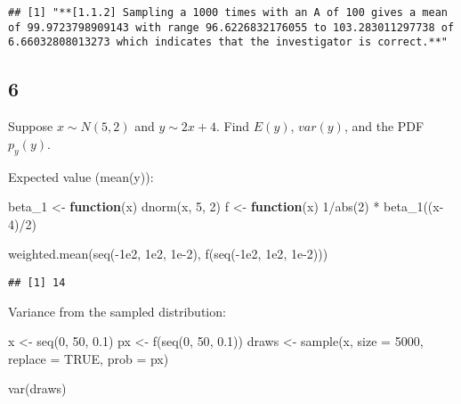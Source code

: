 \documentclass[
]{article}
\newenvironment{Shaded}{\begin{snugshade}}{\end{snugshade}}
\newcommand{\AttributeTok}[1]{\textcolor[rgb]{0.77,0.63,0.00}{#1}}
\newcommand{\ConstantTok}[1]{\textcolor[rgb]{0.00,0.00,0.00}{#1}}
\newcommand{\ControlFlowTok}[1]{\textcolor[rgb]{0.13,0.29,0.53}{\textbf{#1}}}
\newcommand{\DecValTok}[1]{\textcolor[rgb]{0.00,0.00,0.81}{#1}}
\newcommand{\FloatTok}[1]{\textcolor[rgb]{0.00,0.00,0.81}{#1}}
\newcommand{\FunctionTok}[1]{\textcolor[rgb]{0.00,0.00,0.00}{#1}}
\newcommand{\NormalTok}[1]{#1}
\newcommand{\OtherTok}[1]{\textcolor[rgb]{0.56,0.35,0.01}{#1}}
\newcommand{\SpecialCharTok}[1]{\textcolor[rgb]{0.00,0.00,0.00}{#1}}
\begin{document}
\begin{verbatim}
## [1] "**[1.1.2] Sampling a 1000 times with an A of 100 gives a mean of 99.9723798909143 with range 96.6226832176055 to 103.283011297738 of 6.66032808013273 which indicates that the investigator is correct.**"
\end{verbatim}

\hypertarget{section-5}{%
\subsection{6}\label{section-5}}

Suppose \(x\sim N(5,2)\) and \(y\sim 2x+4\). Find \(E(y)\), \(var(y)\),
and the PDF \(p_y(y)\).

Expected value (mean(y)):

\begin{Shaded}
\begin{Highlighting}[]
\NormalTok{beta\_1 }\OtherTok{\textless{}{-}} \ControlFlowTok{function}\NormalTok{(x)}
  \FunctionTok{dnorm}\NormalTok{(x, }\DecValTok{5}\NormalTok{, }\DecValTok{2}\NormalTok{)}
\NormalTok{f }\OtherTok{\textless{}{-}} \ControlFlowTok{function}\NormalTok{(x)}
  \DecValTok{1}\SpecialCharTok{/}\FunctionTok{abs}\NormalTok{(}\DecValTok{2}\NormalTok{) }\SpecialCharTok{*} \FunctionTok{beta\_1}\NormalTok{((x}\DecValTok{{-}4}\NormalTok{)}\SpecialCharTok{/}\DecValTok{2}\NormalTok{)}

\FunctionTok{weighted.mean}\NormalTok{(}\FunctionTok{seq}\NormalTok{(}\SpecialCharTok{{-}}\FloatTok{1e2}\NormalTok{, }\FloatTok{1e2}\NormalTok{, }\FloatTok{1e{-}2}\NormalTok{), }\FunctionTok{f}\NormalTok{(}\FunctionTok{seq}\NormalTok{(}\SpecialCharTok{{-}}\FloatTok{1e2}\NormalTok{, }\FloatTok{1e2}\NormalTok{, }\FloatTok{1e{-}2}\NormalTok{)))}
\end{Highlighting}
\end{Shaded}

\begin{verbatim}
## [1] 14
\end{verbatim}

Variance from the sampled distribution:

\begin{Shaded}
\begin{Highlighting}[]
\NormalTok{x }\OtherTok{\textless{}{-}} \FunctionTok{seq}\NormalTok{(}\DecValTok{0}\NormalTok{, }\DecValTok{50}\NormalTok{, }\FloatTok{0.1}\NormalTok{)}
\NormalTok{px }\OtherTok{\textless{}{-}} \FunctionTok{f}\NormalTok{(}\FunctionTok{seq}\NormalTok{(}\DecValTok{0}\NormalTok{, }\DecValTok{50}\NormalTok{, }\FloatTok{0.1}\NormalTok{))}
\NormalTok{draws }\OtherTok{\textless{}{-}} \FunctionTok{sample}\NormalTok{(x, }\AttributeTok{size =} \DecValTok{5000}\NormalTok{, }\AttributeTok{replace =} \ConstantTok{TRUE}\NormalTok{, }\AttributeTok{prob =}\NormalTok{ px)}

\FunctionTok{var}\NormalTok{(draws)}
\end{Highlighting}
\end{Shaded}
\end{document}

